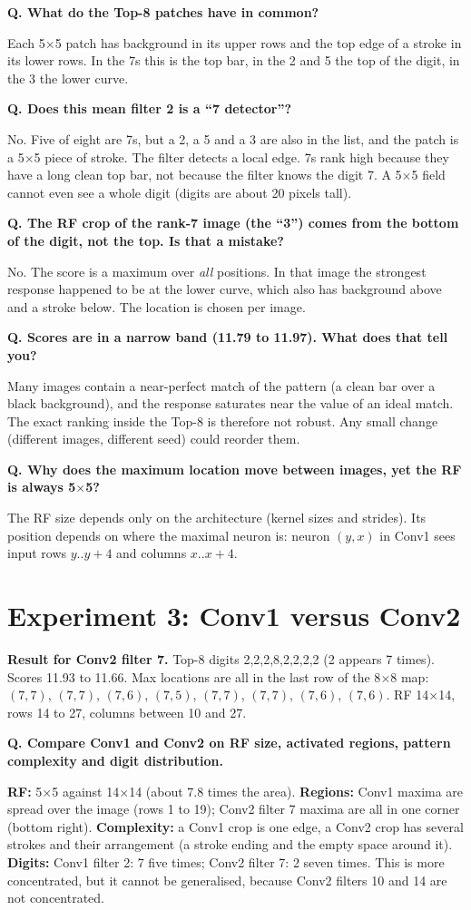 \documentclass[11pt]{article}
\newcommand{\Q}[1]{\par\vspace{4pt}\noindent\textcolor{qcol}{\textbf{Q. #1}}\par\nopagebreak}
\newcommand{\A}[1]{\noindent #1\par}
\begin{document}
\Q{What do the Top-8 patches have in common?}
\A{Each 5$\times$5 patch has background in its upper rows and the top edge of a stroke in its lower rows. In the 7s this is the top bar, in the 2 and 5 the top of the digit, in the 3 the lower curve.}

\Q{Does this mean filter 2 is a ``7 detector''?}
\A{No. Five of eight are 7s, but a 2, a 5 and a 3 are also in the list, and the patch is a 5$\times$5 piece of stroke. The filter detects a local edge. 7s rank high because they have a long clean top bar, not because the filter knows the digit 7. A 5$\times$5 field cannot even see a whole digit (digits are about 20 pixels tall).}

\Q{The RF crop of the rank-7 image (the ``3'') comes from the bottom of the digit, not the top. Is that a mistake?}
\A{No. The score is a maximum over \emph{all} positions. In that image the strongest response happened to be at the lower curve, which also has background above and a stroke below. The location is chosen per image.}

\Q{Scores are in a narrow band (11.79 to 11.97). What does that tell you?}
\A{Many images contain a near-perfect match of the pattern (a clean bar over a black background), and the response saturates near the value of an ideal match. The exact ranking inside the Top-8 is therefore not robust. Any small change (different images, different seed) could reorder them.}

\Q{Why does the maximum location move between images, yet the RF is always 5$\times$5?}
\A{The RF size depends only on the architecture (kernel sizes and strides). Its position depends on where the maximal neuron is: neuron $(y,x)$ in Conv1 sees input rows $y..y+4$ and columns $x..x+4$.}

\section{Experiment 3: Conv1 versus Conv2}

\textbf{Result for Conv2 filter 7.} Top-8 digits 2,2,2,8,2,2,2,2 (2 appears 7 times). Scores 11.93 to 11.66. Max locations are all in the last row of the 8$\times$8 map: $(7,7)$, $(7,7)$, $(7,6)$, $(7,5)$, $(7,7)$, $(7,7)$, $(7,6)$, $(7,6)$. RF 14$\times$14, rows 14 to 27, columns between 10 and 27.

\Q{Compare Conv1 and Conv2 on RF size, activated regions, pattern complexity and digit distribution.}
\A{\textbf{RF:} 5$\times$5 against 14$\times$14 (about 7.8 times the area). \textbf{Regions:} Conv1 maxima are spread over the image (rows 1 to 19); Conv2 filter 7 maxima are all in one corner (bottom right). \textbf{Complexity:} a Conv1 crop is one edge, a Conv2 crop has several strokes and their arrangement (a stroke ending and the empty space around it). \textbf{Digits:} Conv1 filter 2: 7 five times; Conv2 filter 7: 2 seven times. This is more concentrated, but it cannot be generalised, because Conv2 filters 10 and 14 are not concentrated.}
\end{document}
